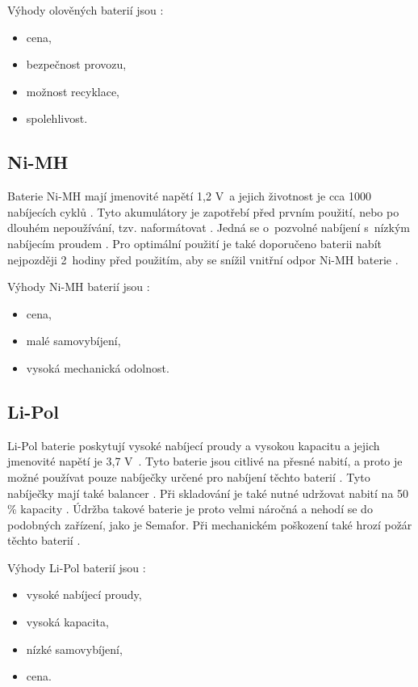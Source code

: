 Výhody olověných baterií jsou \cite{olovene}:
\begin{itemize}
  \item cena,
  \item bezpečnost provozu,
  \item možnost recyklace,
  \item spolehlivost. 
\end{itemize}

\subsection{Ni-MH}
Baterie Ni-MH mají jmenovité napětí 1,2 V~a jejich životnost je cca 1000 nabíjecích cyklů \cite{akumulatory}. Tyto akumulátory je zapotřebí před prvním použití, nebo po 
dlouhém nepoužívání, tzv. naformátovat \cite{akumulatory}. 
Jedná se o~pozvolné nabíjení s~nízkým nabíjecím proudem \cite{akumulatory}. Pro optimální použití je také doporučeno baterii nabít nejpozději 2~hodiny před použitím, aby se 
snížil vnitřní odpor Ni-MH baterie \cite{akumulatory}.

Výhody Ni-MH baterií jsou \cite{akumulatory}:
\begin{itemize}
  \item cena,
  \item malé samovybíjení,
  \item vysoká mechanická odolnost.
\end{itemize}

\subsection{Li-Pol}
Li-Pol baterie poskytují vysoké nabíjecí proudy a vysokou kapacitu a jejich jmenovité napětí je 3,7 V~\cite{akumulatory}. Tyto baterie jsou citlivé na přesné nabití, a proto 
je možné používat pouze nabíječky určené pro nabíjení těchto baterií \cite{akumulatory}. Tyto nabíječky mají také balancer \cite{akumulatory}. Při skladování je také nutné 
udržovat nabití na 50 \% kapacity \cite{akumulatory}. Údržba takové baterie je proto velmi náročná a nehodí se do podobných zařízení, jako je Semafor. Při mechanickém poškození 
také hrozí požár těchto baterií \cite{akumulatory}.

Výhody Li-Pol baterií jsou \cite{akumulatory}:
\begin{itemize}
  \item vysoké nabíjecí proudy, 
  \item vysoká kapacita, 
  \item nízké samovybíjení,
  \item cena.
\end{itemize}

